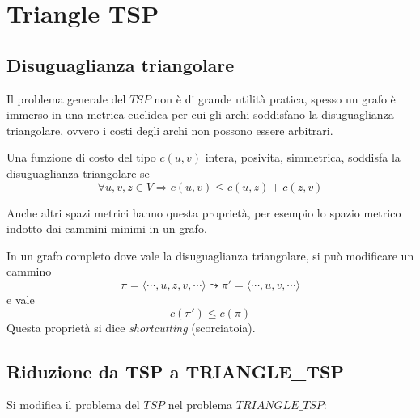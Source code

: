 \section{Triangle TSP}

\subsection{Disuguaglianza triangolare}

Il problema generale del $TSP$ non è di grande utilità pratica, spesso un grafo è immerso in una metrica euclidea per cui gli archi soddisfano la disuguaglianza triangolare, ovvero i costi degli archi non possono essere arbitrari.

\begin{definition}
    \label{def:disuguaglianzatriangolare}
    Una funzione di costo del tipo
    $c (u,v)$
    intera, posivita, simmetrica,
    soddisfa la disuguaglianza triangolare se
    \begin{equation*}
        \forall u,v,z \in V
        \Rightarrow
        c(u,v) \leq c(u,z) + c(z,v)
    \end{equation*}
\end{definition}

Anche altri spazi metrici hanno questa proprietà, per esempio lo spazio metrico indotto dai cammini minimi in un grafo.

\begin{definition}[Shortcutting]
    \label{def:shortcutting}
    In un grafo completo dove vale la disuguaglianza triangolare, si può modificare un cammino
    \begin{equation*}
        \pi = \langle \cdots, u, z, v, \cdots \rangle
        \leadsto
        \pi' = \langle \cdots, u, v, \cdots \rangle
    \end{equation*}
    e vale
    \begin{equation*}
        c (\pi') \leq c(\pi)
    \end{equation*}
    Questa proprietà si dice \emph{shortcutting} (scorciatoia).
\end{definition}

\subsection{Riduzione da TSP a TRIANGLE\_TSP}
Si modifica il problema del $TSP$ nel problema
$TRIANGLE\_TSP$:

